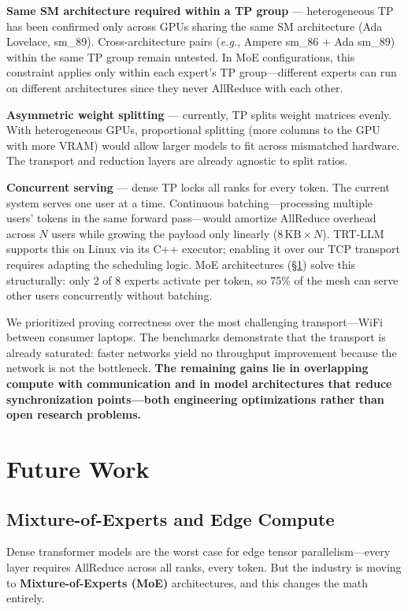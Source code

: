 \documentclass[10pt,twocolumn]{article}
\newcommand{\eg}{\emph{e.g.}}
\begin{document}
\textbf{Same SM architecture required within a TP group} ---
heterogeneous TP has been confirmed only across GPUs sharing the same SM
architecture (Ada Lovelace, sm\_89).  Cross-architecture pairs (\eg,
Ampere sm\_86 + Ada sm\_89) within the same TP group remain untested.
In MoE configurations, this constraint applies only within each expert's
TP group---different experts can run on different architectures since they
never AllReduce with each other.

\textbf{Asymmetric weight splitting} --- currently, TP splits weight
matrices evenly.  With heterogeneous GPUs, proportional splitting (more
columns to the GPU with more VRAM) would allow larger models to fit across
mismatched hardware.  The transport and reduction layers are already
agnostic to split ratios.

\textbf{Concurrent serving} --- dense TP locks all ranks for every token.
The current system serves one user at a time.  Continuous
batching---processing multiple users' tokens in the same forward
pass---would amortize AllReduce overhead across $N$ users while growing
the payload only linearly ($8\,\text{KB} \times N$).  TRT-LLM supports
this on Linux via its C++ executor; enabling it over our TCP transport
requires adapting the scheduling logic.  MoE architectures
(\S\ref{sec:future}) solve this structurally: only 2 of 8 experts activate
per token, so 75\% of the mesh can serve other users concurrently without
batching.

We prioritized proving correctness over the most challenging
transport---WiFi between consumer laptops.  The benchmarks demonstrate
that the transport is already saturated: faster networks yield no
throughput improvement because the network is not the bottleneck.
\textbf{The remaining gains lie in overlapping compute with communication
and in model architectures that reduce synchronization points---both
engineering optimizations rather than open research problems.}

\section{Future Work}\label{sec:future}

\subsection{Mixture-of-Experts and Edge Compute}

Dense transformer models are the worst case for edge tensor
parallelism---every layer requires AllReduce across all ranks, every
token.  But the industry is moving to \textbf{Mixture-of-Experts (MoE)}
architectures, and this changes the math entirely.
\end{document}
